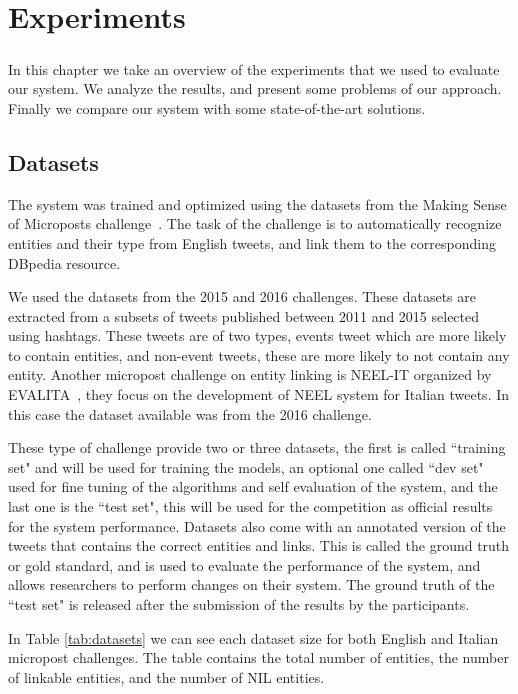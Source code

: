
\chapter{Experiments}
\paragraph{}
In this chapter we take an overview of the experiments that we used to evaluate our system. We analyze the results, and present some problems of our approach. Finally we compare our system with some state-of-the-art solutions.


\section{Datasets}
The system was trained and optimized using the datasets from the Making Sense of Microposts challenge~\cite{rizzo2015making}. The task of the challenge is to automatically recognize entities and their type from English tweets, and link them to the corresponding DBpedia resource.  

We used the datasets from the 2015 and 2016 challenges. These datasets are extracted from a subsets of tweets published between 2011 and 2015 selected using hashtags. These tweets are of two types, events tweet which are more likely to contain entities, and non-event tweets, these are more likely to not contain any entity. 
Another micropost challenge on entity linking is NEEL-IT organized by EVALITA~\cite{basile2016evalita}, they focus on the development of NEEL system for Italian tweets. In this case the dataset available was from the 2016 challenge. 


These type of challenge provide two or three datasets, the first is called ``training set" and will be used for training the models, an optional one called ``dev set" used for fine tuning of the algorithms and self evaluation of the system, and the last one is the ``test set", this will be used for the competition as official results for the system performance. Datasets also come with an annotated version of the tweets that contains the correct entities and links. This is called the ground truth or gold standard, and is used to evaluate the performance of the system, and allows researchers to perform changes on their system. The ground truth of the ``test set" is released after the submission of the results by the participants. 

In Table \ref{tab:datasets} we can see each dataset size for both English and Italian micropost challenges. The table contains the total number of entities, the number of linkable entities, and the number of NIL entities.


